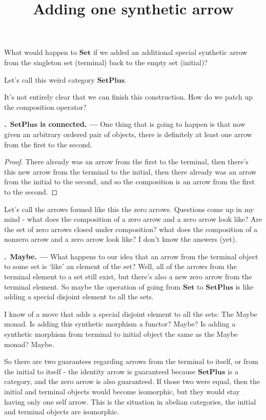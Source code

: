 \documentclass[11pt,noamsfonts]{amsart}
\title{Adding one synthetic arrow}
\newcommand{\pointheader}{\vspace{2mm}\noindent\refstepcounter{section}\textbf{\thesection.}}
\newcommand{\tpoint}[1]{\pointheader~{\bf #1. ---}}
\begin{document}
\maketitle


What would happen to \( \mathbf{Set} \) if we added an additional special synthetic arrow from the singleton set (terminal) back to the empty set (initial)?

Let's call this weird category \( \mathbf{SetPlus} \).

It's not entirely clear that we can finish this construction. How do we patch up the composition operator?

\tpoint{\( \mathbf{SetPlus} \) is connected} One thing that is going to happen is that now given an arbitrary ordered pair of objects, there is definitely at least one arrow from the first to the second.

\begin{proof}
There already was an arrow from the first to the terminal, then there's this new arrow from the terminal to the initial, then there already was an arrow from the initial to the second, and so the composition is an arrow from the first to the second.
\end{proof}

Let's call the arrows formed like this the zero arrows. Questions come up in my mind - what does the composition of a zero arrow and a zero arrow look like? Are the set of zero arrows closed under composition? what does the composition of a nonzero arrow and a zero arrow look like? I don't know the answers (yet). 

\tpoint{Maybe}
What happens to our idea that an arrow from the terminal object to some set is `like' an element of the set? Well, all of the arrows from the terminal element to a set still exist, but there's also a new zero arrow from the terminal element. So maybe the operation of going from \( \mathbf{Set} \) to \( \mathbf{SetPlus} \) is like adding a special disjoint element to all the sets.

I know of a move that adds a special disjoint element to all the sets: The Maybe monad. Is adding this synthetic morphism a functor? Maybe? Is adding a synthetic morphism from terminal to initial object the same as the Maybe monad? Maybe. 

So there are two guarantees regarding arrows from the terminal to itself, or from the initial to itself - the identity arrow is guaranteed because \( \mathbf{SetPlus} \) is a category, and the zero arrow is also guaranteed. If those two were equal, then the initial and terminal objects would become isomorphic, but they would stay having only one self arrow. This is the situation in abelian categories, the initial and terminal objects are isomorphic.
\end{document}
